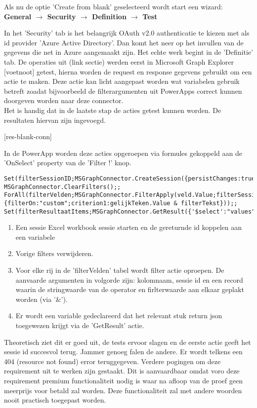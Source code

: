 Als nu de optie 'Create from blank' geselecteerd wordt start een wizard:\\ 
\textbf{General $\rightarrow$ Security $\rightarrow$ Definition $\rightarrow$ Test}

In het 'Security' tab is het belangrijk OAuth v2.0 authenticatie te kiezen met als id provider 'Azure Active Directory'. Dan komt het neer op het invullen van de gegevens die net in Azure aangemaakt zijn. Het echte werk begint in de 'Definitie' tab. De operaties uit (link sectie) werden eerst in Microsoft Graph Explorer [voetnoot] getest, hierna worden de request en response gegevens gebruikt om een actie te maken. Deze actie kan licht aangepast worden wat variabelen gebruik betreft zoadat bijvoorbeeld de filterargumenten uit PowerApps correct kunnen doorgeven worden naar deze connector.\\
Het is handig dat in de laatste stap de acties getest kunnen worden. De resultaten hiervan zijn ingevoegd.

[res-blank-conn]

In de PowerApp worden deze acties opgeroepen via formules gekoppeld aan de 'OnSelect' property van de 'Filter !' knop.
\begin{lstlisting}
Set(filterSessionID;MSGraphConnector.CreateSession({persistChanges:true}).id);;
MSGraphConnector.ClearFilters();;
ForAll(filterVelden;MSGraphConnector.FilterApply(veld.Value;filterSessionID;{filterOn:"custom";criterion1:gelijkTeken.Value & filterTekst}));;
Set(filterResultaatItems;MSGraphConnector.GetResult({'$select':"values"}).value);;
\end{lstlisting}
\begin{enumerate}
    \item Een sessie Excel workbook sessie starten en de gereturnde id koppelen aan een variabele
    \item Vorige filters verwijderen.
    \item Voor elke rij in de 'filterVelden' tabel wordt filter actie oproepen. De aanvaarde argumenten in volgorde zijn: kolomnaam, sessie id en een record waarin de stringwaarde van de operator en firlterwaarde aan elkaar geplakt worden (via '\&').
    \item Er wordt een variable gedeclareerd dat het relevant stuk return json toegewezen krijgt via de 'GetResult' actie.
\end{enumerate}

Theoretisch ziet dit er goed uit, de tests ervoor slagen en de eerste actie geeft het sessie id succesvol terug. Jammer genoeg falen de andere. Er wordt telkens een 404 (resource not found) error teruggegeven. Verdere pogingen om deze requirement uit te werken zijn gestaakt. Dit is aanvaardbaar omdat voro deze requirement premium functionaliteit nodig is waar na afloop van de proef geen meerprijs voor betald zal worden. Deze functionaliteit zal met andere woorden nooit practisch toegepast worden.